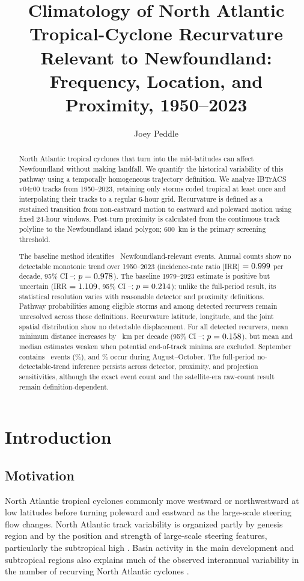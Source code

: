 \documentclass[11pt]{article}
\title{\textbf{Climatology of North Atlantic Tropical-Cyclone Recurvature Relevant to Newfoundland: Frequency, Location, and Proximity, 1950--2023}}
\author{Joey Peddle}
\date{}
\begin{document}
\maketitle

\begin{abstract}
North Atlantic tropical cyclones that turn into the mid-latitudes can affect Newfoundland without making landfall. We quantify the historical variability of this pathway using a temporally homogeneous trajectory definition. We analyze IBTrACS v04r00 tracks from 1950--2023, retaining only storms coded tropical at least once and interpolating their tracks to a regular 6-hour grid. Recurvature is defined as a sustained transition from non-eastward motion to eastward and poleward motion using fixed 24-hour windows. Post-turn proximity is calculated from the continuous track polyline to the Newfoundland island polygon; 600~km is the primary screening threshold.

The baseline method identifies \BaselineN\ Newfoundland-relevant events. Annual counts show no detectable monotonic trend over 1950--2023 (incidence-rate ratio [IRR] \(=0.999\) per decade, 95\% CI \FullCILow--\FullCIHigh; \(p=0.978\)). The baseline 1979--2023 estimate is positive but uncertain (IRR \(=1.109\), 95\% CI \SatelliteCILow--\SatelliteCIHigh; \(p=0.214\)); unlike the full-period result, its statistical resolution varies with reasonable detector and proximity definitions. Pathway probabilities among eligible storms and among detected recurvers remain unresolved across those definitions. Recurvature latitude, longitude, and the joint spatial distribution show no detectable displacement. For all detected recurvers, mean minimum distance increases by \DistanceMeanSlope~km per decade (95\% CI \DistanceMeanLow--\DistanceMeanHigh; \(p=0.158\)), but mean and median estimates weaken when potential end-of-track minima are excluded. September contains \PeakMonthN\ events (\PeakMonthPct\%), and \AugOctPct\% occur during August--October. The full-period no-detectable-trend inference persists across detector, proximity, and projection sensitivities, although the exact event count and the satellite-era raw-count result remain definition-dependent.
\end{abstract}

\section{Introduction}

\subsection{Motivation}
North Atlantic tropical cyclones commonly move westward or northwestward at low latitudes before turning poleward and eastward as the large-scale steering flow changes. North Atlantic track variability is organized partly by genesis region and by the position and strength of large-scale steering features, particularly the subtropical high \citep{Kossin2010,ColbertSoden2012}. Basin activity in the main development and subtropical regions also explains much of the observed interannual variability in the number of recurving North Atlantic cyclones \citep{Sainsbury2022}.
\end{document}
